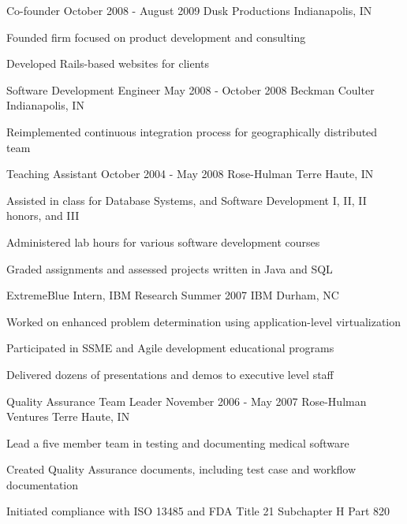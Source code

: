 {\begin{cventries}
  \cventry
  {Co-founder}
  {October 2008 - August 2009}
  {Dusk Productions}
  {Indianapolis, IN}
  {
    \begin{cvitems}
      \item Founded firm focused on product development and consulting
      \item Developed Rails-based websites for clients
    \end{cvitems}
    \cvtags{
      \tagRuby
      \tagRails
      \tagJavaScript
      \tagMySQL
      \tagTDDShort
      \tagECommerce
      \tagProjectManagement
    }
  }

  \cventry
  {Software Development Engineer}
  {May 2008 - October 2008}
  {Beckman Coulter}
  {Indianapolis, IN}
  {
    \begin{cvitems}
      \item Reimplemented continuous integration process for geographically distributed team
    \end{cvitems}
    \cvtags{
      \tagCSharp
      \tagCIShort
      \tagTDDShort
    }
  }

  \cventry
  {Teaching Assistant}
  {October 2004 - May 2008}
  {Rose-Hulman}
  {Terre Haute, IN}
  {
    \begin{cvitems}
      \item Assisted in class for Database Systems, and Software Development I, II, II honors, and III
      \item Administered lab hours for various software development courses
      \item Graded assignments and assessed projects written in Java and SQL
    \end{cvitems}
    \cvtags{
      \tagJava
      \tagMSSQL
      \tagMySQL
      \tagTeaching
    }
  }

  \cventry
  {ExtremeBlue Intern, IBM Research}
  {Summer 2007}
  {IBM}
  {Durham, NC}
  {
    \begin{cvitems}
      \item Worked on enhanced problem determination using application-level virtualization
      \item Participated in SSME and Agile development educational programs
      \item Delivered dozens of presentations and demos to executive level staff
    \end{cvitems}
    \cvtags{
      \tagCplusplus
      \tagPublicSpeaking
    }
  }

  \cventry
  {Quality Assurance Team Leader}
  {November 2006 - May 2007}
  {Rose-Hulman Ventures}
  {Terre Haute, IN}
  {
    \begin{cvitems}
      \item Lead a five member team in testing and documenting medical software
      \item Created Quality Assurance documents, including test case and workflow documentation
      \item Initiated compliance with ISO 13485 and FDA Title 21 Subchapter H Part 820
    \end{cvitems}
    \cvtags{\tagManualQATestingShort}
  }


\end{cventries}}
